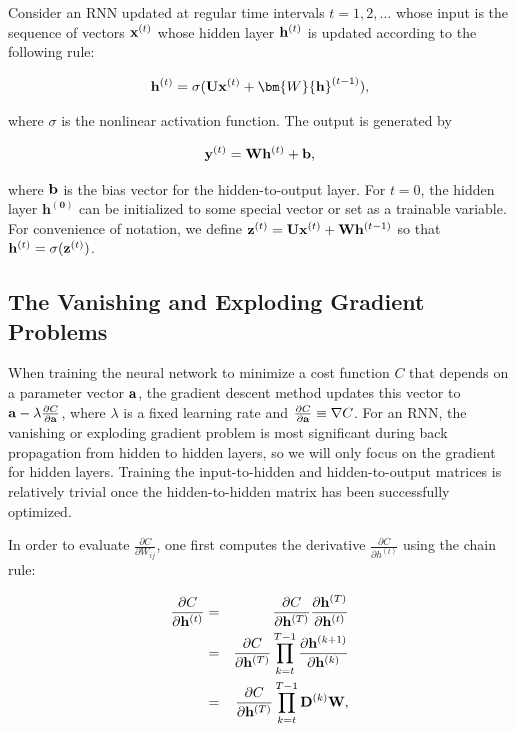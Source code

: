 Consider an RNN updated at regular time intervals $t=1,2,...$ whose input is the sequence of vectors ${\bf x}^{(t)}$ whose hidden layer ${\bf h}^{(t)}$ is updated according to the following rule:

\begin{equation}
{\bf h}^{(t)}=\sigma({\bf U}{\bf x}^{(t)}+\bm{W}{\bf h}^{(t-1)}),
\end{equation}

where $\sigma$ is the nonlinear activation function. The output is generated by

\begin{equation}
{\bf y}^{(t)}={\bf W}{\bf h}^{(t)}+{\bf b},
\end{equation}

where ${\bf b}$ is the bias vector for the hidden-to-output layer. For $t=0$, the hidden layer $\mathbf{h^{(0)}}$ can be initialized to some special vector or set as a trainable variable. For convenience of notation, we define ${\bf z}^{(t)} ={\bf U}{\bf x}^{(t)}+{\bf W}{\bf h}^{(t-1)}$ so that ${\bf h}^{(t)}=\sigma({{\bf z}^{(t)}})$.

\subsection{The Vanishing and Exploding Gradient Problems}

When training the neural network to minimize a cost function $C$ that depends on a parameter vector ${\bf a}$, the gradient descent method updates this vector to 
${\bf a}-\lambda\frac{\partial C}{\partial{\bf a}}$, where $\lambda$ is a fixed learning rate and $\frac{\partial C}{\partial{\bf a}}\equiv\nabla C$. For an RNN, the vanishing or exploding gradient problem is most significant during back propagation from hidden to hidden layers, so we will only focus on the gradient for hidden layers. Training the input-to-hidden and hidden-to-output matrices is relatively trivial once the hidden-to-hidden matrix has been successfully optimized.

In order to evaluate $\frac{\partial C}{\partial W_{ij}}$, one first computes the derivative $\frac{\partial C}{\partial h^{(t)}}$ using the chain rule:

\begin{eqnarray}
\frac{\partial C}{\partial{\bf h}^{(t)}} &=& \frac{\partial C}{\partial{\bf h}^{(T)}} \frac{\partial{\bf h}^{(T)}}{\partial{\bf h}^{(t)}} \\
&=&\frac{\partial C}{\partial{\bf h}^{(T)}}\prod_{k=t}^{T-1} \frac{\partial {\bf h}^{(k+1)}}{\partial{\bf h}^{(k)}}\\
&=&\frac{\partial C}{\partial{\bf h}^{(T)}}\prod_{k=t}^{T-1} {\bf D}^{(k)} {{\bf W}},
\end{eqnarray}

